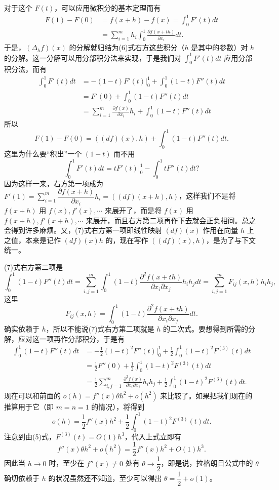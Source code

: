 对于这个 $F(t)$，可以应用微积分的基本定理而有
\begin{equation}
 \begin{aligned}
 F(1)-F(0)&=f(x+h)-f(x)=\int_0^1F'(t)dt\\
 &=\sum_{i=1}^m h_i\int_0^1\frac{\partial f(x+th)}{\partial x_i}dt.
 \end{aligned}
 \tag{6}
\end{equation}
于是，$(\Delta_hf)(x)$ 的分解就归结为(6)式右方这些积分（$h$ 是其中的参数）对 $h$ 的分解。这一分解可以用分部积分法来实现，于是我们对 $\int_0^1F'(t)dt$ 应用分部积分法，而有
\begin{align*}
 \int_0^1F'(t)dt
 &=- (1-t)F'(t)\big|_0^1+\int_0^1(1-t)F''(t)dt\\
 &=F'(0)+\int_0^1(1-t)F''(t)dt\\
 &=\sum_{i=1}^m\frac{\partial f(x)}{\partial x_i}h_i+\int_0^1(1-t)F''(t)dt
\end{align*}
所以
\begin{equation}
 F(1)-F(0)=((df)(x),h)+\int_0^1(1-t)F''(t)dt.
 \tag{7}
\end{equation}
这里为什么要“积出”一个 $(1-t)$ 而不用
\[
 \int_0^1F'(t)dt=tF'(t)\big|_0^1-\int_0^1tF''(t)dt?
\]
因为这样一来，右方第一项成为 $F'(1)=\sum_{i=1}^m\dfrac{\partial f(x+h)}{\partial x_i}h_i=((df)(x+h),h)$，这样我们不是将 $f(x+h)$ 用 $f(x),f'(x),\cdots$ 来展开了，而是将 $f(x)$ 用 $f(x+h),f'(x+h),\cdots$ 来展开，而且右方第二项再作下去就会正负相间。总之会得到许多麻烦。又，(7)式右方第一项即线性映射 $(df)(x)$ 作用在向量 $h$ 上之值，本来是记作 $(df)(x)h$ 的，现在写作 $((df)(x),h)$，是为了与下文统一。

(7)式右方第二项是
\[
 \int_0^1(1-t)F''(t)dt
 =\sum_{i,j=1}^m\int_0^1(1-t)\frac{\partial^2f(x+th)}{\partial x_i\partial x_j}h_i h_jdt
 =\sum_{i,j=1}^m F_{ij}(x,h)h_i h_j,
\]
这里
\[
 F_{ij}(x,h)=\int_0^1(1-t)\frac{\partial^2f(x+th)}{\partial x_i\partial x_j}dt.
\]
确实依赖于 $h$，所以不能说(7)式右方第二项就是 $h$ 的二次式。要想得到所需的分解，应对这一项再作分部积分，于是有
\begin{align*}
 \int_0^1(1-t)F''(t)dt
 &=-\frac12(1-t)^2F''(t)\big|_0^1+\frac12\int_0^1(1-t)^2F^{(3)}(t)dt\\
 &=\frac12F''(0)+\frac12\int_0^1(1-t)^2F^{(3)}(t)dt\\
 &=\frac12\sum_{i,j=1}^m\frac{\partial^2f(x)}{\partial x_i\partial x_j}h_i h_j
 +\frac12\int_0^1(1-t)^2F^{(3)}(t)dt.
\end{align*}
现在可以和前面的 $o(h)=f''(x)\theta h^2+o(h^2)$ 来比较了。如果把我们现在的推算用于它（即 $m=n=1$ 的情况），将得到
\[
 o(h)=\frac12f''(x)h^2+\frac12\int_0^1(1-t)^2F^{(3)}(t)dt.
\]
注意到由(5)式，$F^{(3)}(t)=O(1)h^3$，代入上式立即有
\[
 f''(x)\theta h^2+o(h^2)=\frac12f''(x)h^2+O(1)h^3.
\]
因此当 $h\to0$ 时，至少在 $f''(x)\ne0$ 处有 $\theta\to\dfrac12$，即是说，拉格朗日公式中的 $\theta$ 确切依赖于 $h$ 的状况虽然还不知道，至少可以得出 $\theta=\dfrac12+o(1)$。


